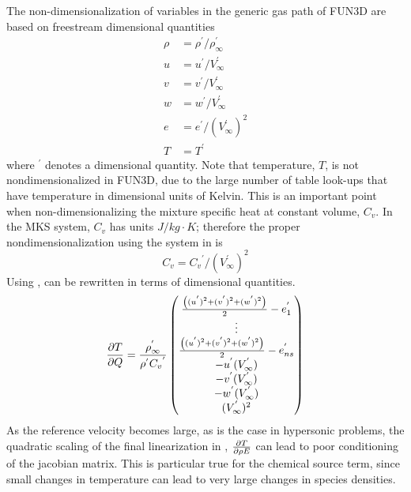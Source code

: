 The non-dimensionalization of variables in the generic gas path of FUN3D are
based on freestream dimensional quantities
\begin{equation}
  \begin{aligned}
    \rho &= \rho^{'} / \rho^{'}_{\infty} \\
    u &= u^{'} / V^{'}_{\infty} \\
    v &= v^{'} / V^{'}_{\infty} \\
    w &= w^{'} / V^{'}_{\infty} \\
    e &= e^{'} / \left( V^{'}_{\infty} \right)^2 \\
    T &= T^{'}
  \end{aligned}
  \label{nondim-gg}
\end{equation}
where $^{'}$ denotes a dimensional quantity. Note that temperature, $T$, is not
nondimensionalized in FUN3D, due to the large number of table look-ups that have
temperature in dimensional units of Kelvin.  This is an important point when
non-dimensionalizing the mixture specific heat at constant volume, $C_v$.  In
the MKS system, $C_v$ has units $J/kg \cdot K$; therefore the proper
nondimensionalization using the system in  is
\begin{equation}
  C_v = {C_v}^{'}/\left( V^{'}_{\infty} \right)^2
  \label{cv-nondim}
\end{equation}
Using ,  can be rewritten in
terms of dimensional quantities.
\begin{equation}
  \frac{\partial T}{\partial Q} =
  \frac{\rho^{'}_{\infty}}{\rho^{'} {C_v}^{'}}
  \begin{pmatrix}
    \frac{\left( (u^{'})^2 + (v^{'})^2 + (w^{'})^2 \right)}{2} - e^{'}_1 \\
    \vdots \\
    \frac{\left( (u^{'})^2 + (v^{'})^2 + (w^{'})^2 \right)}{2} - e^{'}_{ns} \\
    -u^{'}(V^{'}_{\infty}) \\
    -v^{'}(V^{'}_{\infty}) \\
    -w^{'}(V^{'}_{\infty}) \\
    (V^{'}_{\infty})^2
  \end{pmatrix}
  \label{tjac-dim}
\end{equation}
As the reference velocity becomes large, as is the case in hypersonic problems,
the quadratic scaling of the final linearization in ,
$\frac{\partial T}{\partial \rho E}$ can lead to poor conditioning of the jacobian matrix.  This is
particular true for the chemical source term, since small changes in temperature
can lead to very large changes in species densities.
